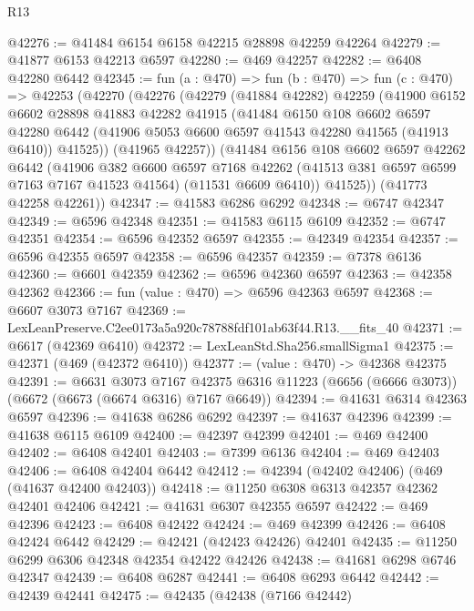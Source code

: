 \begin{lexlean}{R13}
\begin{coremodule}
@42276 := @41484 @6154 @6158 @42215 @28898 @42259 @42264
@42279 := @41877 @6153 @42213 @6597
@42280 := @469 @42257
@42282 := @6408 @42280 @6442
@42345 := fun (a : @470) =>
  fun (b : @470) =>
  fun (c : @470) =>
  @42253
    (@42270
      (@42276
        (@42279
          (@41884 @42282)
          @42259
          (@41900
            @6152
            @6602
            @28898
            @41883
            @42282
            @41915
            (@41484
              @6150
              @108
              @6602
              @6597
              @42280
              @6442
              (@41906 @5053 @6600 @6597 @41543 @42280 @41565 (@41913 @6410))
              @41525))
          (@41965 @42257))
        (@41484
          @6156
          @108
          @6602
          @6597
          @42262
          @6442
          (@41906
            @382
            @6600
            @6597
            @7168
            @42262
            (@41513 @381 @6597 @6599 @7163 @7167 @41523 @41564)
            (@11531 @6609 @6410))
          @41525))
      (@41773 @42258 @42261))
@42347 := @41583 @6286 @6292
@42348 := @6747 @42347
@42349 := @6596 @42348
@42351 := @41583 @6115 @6109
@42352 := @6747 @42351
@42354 := @6596 @42352 @6597
@42355 := @42349 @42354
@42357 := @6596 @42355 @6597
@42358 := @6596 @42357
@42359 := @7378 @6136
@42360 := @6601 @42359
@42362 := @6596 @42360 @6597
@42363 := @42358 @42362
@42366 := fun (value : @470) => @6596 @42363 @6597
@42368 := @6607 @3073 @7167
@42369 := LexLeanPreserve.C2ee0173a5a920c78788fdf101ab63f44.R13.__fits_40
@42371 := @6617 (@42369 @6410)
@42372 := LexLeanStd.Sha256.smallSigma1
@42375 := @42371 (@469 (@42372 @6410))
@42377 := (value : @470) -> @42368 @42375
@42391 := @6631
    @3073
    @7167
    @42375
    @6316
    @11223
    (@6656 (@6666 @3073))
    (@6672 (@6673 (@6674 @6316) @7167 @6649))
@42394 := @41631 @6314 @42363 @6597
@42396 := @41638 @6286 @6292
@42397 := @41637 @42396
@42399 := @41638 @6115 @6109
@42400 := @42397 @42399
@42401 := @469 @42400
@42402 := @6408 @42401
@42403 := @7399 @6136
@42404 := @469 @42403
@42406 := @6408 @42404 @6442
@42412 := @42394 (@42402 @42406) (@469 (@41637 @42400 @42403))
@42418 := @11250 @6308 @6313 @42357 @42362 @42401 @42406
@42421 := @41631 @6307 @42355 @6597
@42422 := @469 @42396
@42423 := @6408 @42422
@42424 := @469 @42399
@42426 := @6408 @42424 @6442
@42429 := @42421 (@42423 @42426) @42401
@42435 := @11250 @6299 @6306 @42348 @42354 @42422 @42426
@42438 := @41681 @6298 @6746 @42347
@42439 := @6408 @6287
@42441 := @6408 @6293 @6442
@42442 := @42439 @42441
@42475 := @42435
    (@42438
      (@7166 @42442)

\end{coremodule}
\end{lexlean}
